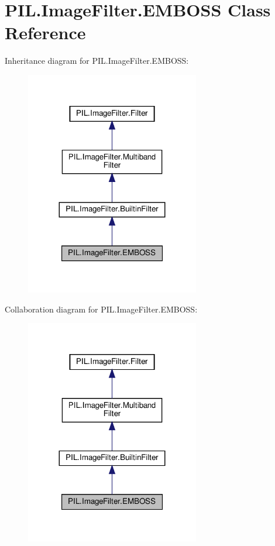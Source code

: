 \hypertarget{classPIL_1_1ImageFilter_1_1EMBOSS}{}\section{P\+I\+L.\+Image\+Filter.\+E\+M\+B\+O\+SS Class Reference}
\label{classPIL_1_1ImageFilter_1_1EMBOSS}


Inheritance diagram for P\+I\+L.\+Image\+Filter.\+E\+M\+B\+O\+SS\+:
\nopagebreak
\begin{figure}[H]
\begin{center}
\leavevmode
\includegraphics[width=215pt]{classPIL_1_1ImageFilter_1_1EMBOSS__inherit__graph}
\end{center}
\end{figure}


Collaboration diagram for P\+I\+L.\+Image\+Filter.\+E\+M\+B\+O\+SS\+:
\nopagebreak
\begin{figure}[H]
\begin{center}
\leavevmode
\includegraphics[width=215pt]{classPIL_1_1ImageFilter_1_1EMBOSS__coll__graph}
\end{center}
\end{figure}
